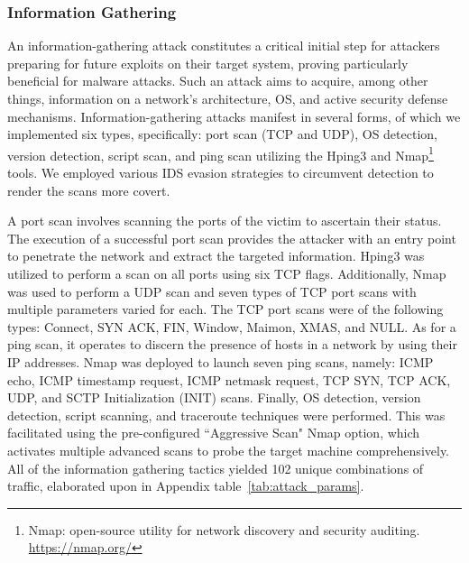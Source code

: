 \documentclass[lettersize,journal]{IEEEtran}
\begin{document}
\subsubsection{Information Gathering}\label{sec:info_gathering}
An information-gathering attack constitutes a critical initial step for attackers preparing for future exploits on their target system, proving particularly beneficial for malware attacks. Such an attack aims to acquire, among other things, information on a network's architecture, \ac{OS}, and active security defense mechanisms. Information-gathering attacks manifest in several forms, of which we implemented six types, specifically: port scan (\ac{TCP} and \ac{UDP}), \ac{OS} detection, version detection, script scan, and ping scan utilizing the Hping3 and Nmap\footnote{Nmap: open-source utility for network discovery and security auditing. \url{https://nmap.org/}} tools. We employed various \ac{IDS} evasion strategies to circumvent detection to render the scans more covert. 

A port scan involves scanning the ports of the victim to ascertain their status. The execution of a successful port scan provides the attacker with an entry point to penetrate the network and extract the targeted information. Hping3 was utilized to perform a scan on all ports using six \ac{TCP} flags. Additionally, Nmap was used to perform a \ac{UDP} scan and seven types of \ac{TCP} port scans with multiple parameters varied for each. The TCP port scans were of the following types: Connect, SYN ACK, FIN, Window, Maimon, XMAS, and NULL. As for a ping scan, it operates to discern the presence of hosts in a network by using their \ac{IP} addresses. Nmap was deployed to launch seven ping scans, namely: \ac{ICMP} echo, \ac{ICMP} timestamp request, \ac{ICMP} netmask request, \ac{TCP} SYN, \ac{TCP} ACK, \ac{UDP}, and \ac{SCTP} Initialization (INIT) scans. Finally, OS detection, version detection, script scanning, and traceroute techniques were performed. This was facilitated using the pre-configured ``Aggressive Scan" Nmap option, which activates multiple advanced scans to probe the target machine comprehensively. All of the information gathering tactics yielded 102 unique combinations of traffic, elaborated upon in Appendix table~\ref{tab:attack_params}.
\end{document}
